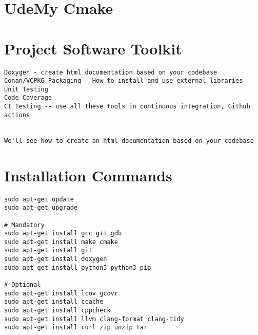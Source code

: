 \section{UdeMy Cmake}


\section{Project Software Toolkit}

\begin{verbatim}
Doxygen - create html documentation based on your codebase
Conan/VCPKG Packaging - How to install and use external libraries
Unit Testing
Code Coverage 
CI Testing -- use all these tools in continuous integration, Github actions


We'll see how to create an html documentation based on your codebase
\end{verbatim}


\section{Installation Commands}


\begin{verbatim}
sudo apt-get update
sudo apt-get upgrade
 
# Mandatory
sudo apt-get install gcc g++ gdb
sudo apt-get install make cmake
sudo apt-get install git
sudo apt-get install doxygen
sudo apt-get install python3 python3-pip
 
# Optional
sudo apt-get install lcov gcovr
sudo apt-get install ccache
sudo apt-get install cppcheck
sudo apt-get install llvm clang-format clang-tidy
sudo apt-get install curl zip unzip tar
\end{verbatim}







